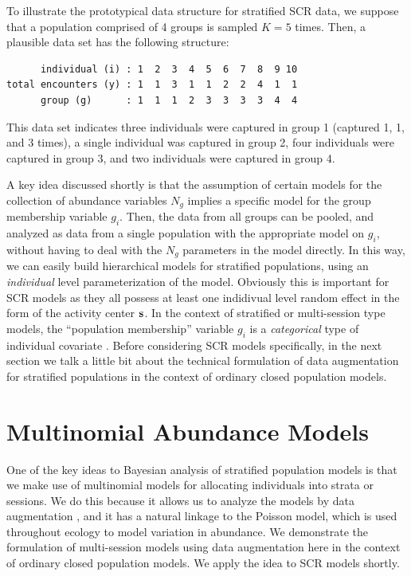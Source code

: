 To illustrate the prototypical data structure for stratified SCR data,
we suppose that a population comprised of 4 groups is sampled
$K=5$ times. Then, a plausible data set has the following structure:
\begin{verbatim}
      individual (i) : 1  2  3  4  5  6  7  8  9 10
total encounters (y) : 1  1  3  1  1  2  2  4  1  1
      group (g)      : 1  1  1  2  3  3  3  3  4  4
\end{verbatim}
This data set indicates three individuals were captured in
group 1 (captured 1, 1, and 3 times), a single individual was
captured in group 2, four individuals were captured in group
3, and two individuals were captured in group 4.

A key idea discussed shortly is that the assumption of certain models
for the collection of abundance variables $N_{g}$ implies a specific
model for the group membership variable $g_{i}$.  Then, the data from
all groups can be pooled, and analyzed as data from a single
population with the appropriate model on $g_{i}$, without having to
deal with the $N_{g}$ parameters in the model directly. In this way,
we can easily build hierarchical models for stratified populations,
using an {\it individual} level parameterization of the
model. Obviously this is important for SCR models as they all possess
at least one indidivual level random effect in the form of the
activity center ${\bf s}$.  In the context of stratified or
multi-session type models, the ``population membership'' variable
$g_{i}$ is a {\it categorical} type of individual covariate
\citep{huggins:1989, alho:1990, royle:2009}.  Before considering SCR
models specifically, in the next section we talk a little bit about
the technical formulation of data augmentation for stratified
populations in the context of ordinary closed population models.


\section{Multinomial Abundance Models}

One of the key ideas to Bayesian analysis of stratified population
models is that we make use of multinomial models for allocating
individuals into strata or sessions. We do this because it allows us
to analyze the models by data augmentation \citep{converse_royle:2012,
  royle_converse:2013}, and it has a natural linkage to the Poisson
model, which is used throughout ecology to model variation in
abundance. We demonstrate the formulation of multi-session models using
data augmentation here in the context of ordinary closed population
models. We apply the idea to SCR models shortly.

